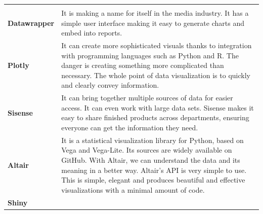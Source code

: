 \documentclass[]{book}
\begin{document}
\begin{longtable}[]{@{}ll@{}}
\begin{minipage}[t]{0.79\columnwidth}
\end{minipage}\tabularnewline
\begin{minipage}[t]{0.15\columnwidth}\raggedright
\textbf{Datawrapper}\strut
\end{minipage} & \begin{minipage}[t]{0.79\columnwidth}\raggedright
It is making a name for itself in the media industry. It has a simple user interface making it easy to generate charts and embed into reports.\strut
\end{minipage}\tabularnewline
\begin{minipage}[t]{0.15\columnwidth}\raggedright
\textbf{Plotly}\strut
\end{minipage} & \begin{minipage}[t]{0.79\columnwidth}\raggedright
It can create more sophisticated visuals thanks to integration with programming languages such as Python and R. The danger is creating something more complicated than necessary. The whole point of data visualization is to quickly and clearly convey information.\strut
\end{minipage}\tabularnewline
\begin{minipage}[t]{0.15\columnwidth}\raggedright
\textbf{Sisense}\strut
\end{minipage} & \begin{minipage}[t]{0.79\columnwidth}\raggedright
It can bring together multiple sources of data for easier access. It can even work with large data sets. Sisense makes it easy to share finished products across departments, ensuring everyone can get the information they need.\strut
\end{minipage}\tabularnewline
\begin{minipage}[t]{0.15\columnwidth}\raggedright
\textbf{Altair}\strut
\end{minipage} & \begin{minipage}[t]{0.79\columnwidth}\raggedright
It is a statistical visualization library for Python, based on Vega and Vega-Lite. Its sources are widely available on GitHub. With Altair, we can understand the data and its meaning in a better way. Altair's API is very simple to use. This is simple, elegant and produces beautiful and effective visualizations with a minimal amount of code.\strut
\end{minipage}\tabularnewline
\begin{minipage}[t]{0.15\columnwidth}\raggedright
\textbf{Shiny}\strut
\end{minipage} & \begin{minipage}[t]{0.79\columnwidth}\raggedright

\end{minipage}
\end{longtable}
\end{document}

